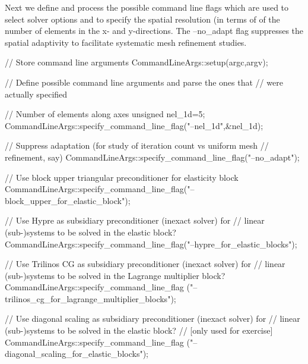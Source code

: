 Next we define and process the possible command line flags which are used to select solver options and to specify the spatial resolution (in terms of of the number of elements in the x-\/ and y-\/directions. The {\ttfamily --no\+\_\+adapt} flag suppresses the spatial adaptivity to facilitate systematic mesh refinement studies.


\begin{DoxyCodeInclude}

 \textcolor{comment}{// Store command line arguments}
 CommandLineArgs::setup(argc,argv);

 \textcolor{comment}{// Define possible command line arguments and parse the ones that}
 \textcolor{comment}{// were actually specified}

 \textcolor{comment}{// Number of elements along axes}
 \textcolor{keywordtype}{unsigned} nel\_1d=5;
 CommandLineArgs::specify\_command\_line\_flag(\textcolor{stringliteral}{"--nel\_1d"},&nel\_1d);

 \textcolor{comment}{// Suppress adaptation (for study of iteration count vs uniform mesh }
 \textcolor{comment}{// refinement, say)}
 CommandLineArgs::specify\_command\_line\_flag(\textcolor{stringliteral}{"--no\_adapt"});

 \textcolor{comment}{// Use block upper triangular preconditioner for elasticity block}
 CommandLineArgs::specify\_command\_line\_flag(\textcolor{stringliteral}{"--block\_upper\_for\_elastic\_block"});

 \textcolor{comment}{// Use Hypre as subsidiary preconditioner (inexact solver) for}
 \textcolor{comment}{// linear (sub-)systems to be solved in the elastic block?}
 CommandLineArgs::specify\_command\_line\_flag(\textcolor{stringliteral}{"--hypre\_for\_elastic\_blocks"});

 \textcolor{comment}{// Use Trilinos CG as subsidiary preconditioner (inexact solver) for}
 \textcolor{comment}{// linear (sub-)systems to be solved in the Lagrange multiplier block?}
 CommandLineArgs::specify\_command\_line\_flag
  (\textcolor{stringliteral}{"--trilinos\_cg\_for\_lagrange\_multiplier\_blocks"});

 \textcolor{comment}{// Use diagonal scaling as subsidiary preconditioner (inexact solver) for}
 \textcolor{comment}{// linear (sub-)systems to be solved in the elastic block?}
 \textcolor{comment}{// [only used for exercise]}
 CommandLineArgs::specify\_command\_line\_flag
  (\textcolor{stringliteral}{"--diagonal\_scaling\_for\_elastic\_blocks"});

\end{DoxyCodeInclude}


